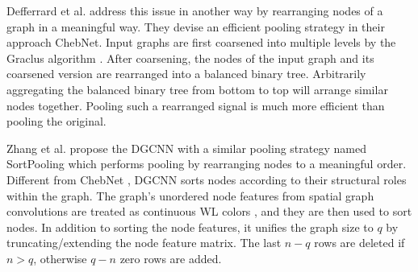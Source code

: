     Defferrard et al. \cite{defferrard2016convolutional} address this issue in another way by rearranging nodes of a graph in a meaningful way. They devise an efficient pooling strategy in their approach ChebNet. Input graphs are first coarsened into multiple levels by the Graclus algorithm \cite{dhillon2007weighted}. After coarsening, the nodes of the input graph and its coarsened version are rearranged into a balanced binary tree. Arbitrarily aggregating the balanced binary tree from bottom to top will arrange similar nodes together. Pooling such a rearranged signal is much more efficient than pooling the original.
    
    
    Zhang et al. \cite{zhang2018end} propose the DGCNN with a similar pooling strategy named SortPooling which performs pooling by rearranging nodes to a meaningful order. Different from ChebNet \cite{defferrard2016convolutional}, DGCNN sorts nodes according to their structural roles within the graph. The graph's unordered node features from spatial graph convolutions are treated as continuous WL colors \cite{weisfeiler1968reduction}, and they are then used to sort nodes. In addition to sorting the node features, it unifies the graph size to $q$ by truncating/extending the node feature matrix. The last $n-q$ rows are deleted if $n>q$, otherwise $q-n$ zero rows are added. %


